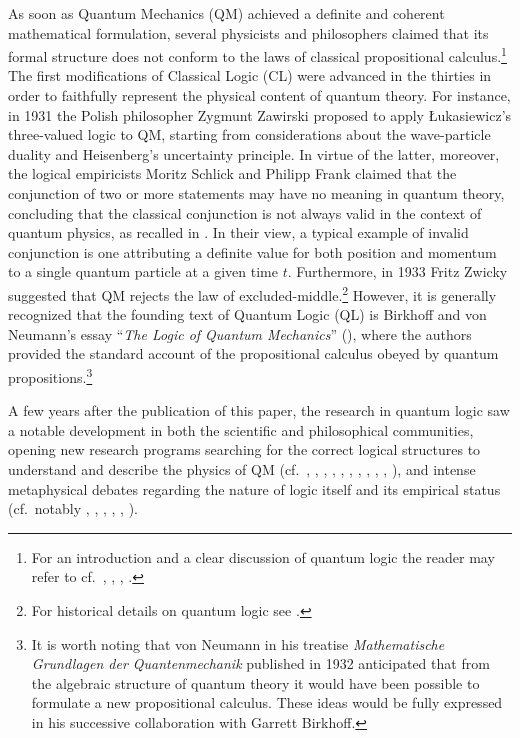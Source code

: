 \documentclass[11pt, executivepaper]{article}
\begin{document}
As soon as Quantum Mechanics (QM) achieved a definite and coherent mathematical formulation, several physicists and philosophers claimed that its formal structure does not conform to the laws of classical propositional calculus.\footnote{For an introduction and a clear discussion of quantum logic the reader may refer to cf.\ \cite{Giuntini:2002}, \cite{DallaChiara:2004}, \cite{deRonde:2016}, \cite{Wilce:2021}.} The first modifications of Classical Logic (CL) were advanced in the thirties in order to faithfully represent the physical content of quantum theory. For instance, in 1931 the Polish philosopher Zygmunt Zawirski proposed to apply \L ukasiewicz's three-valued logic to QM, starting from considerations about the wave-particle duality and Heisenberg's uncertainty principle. In virtue of the latter, moreover, the logical empiricists Moritz Schlick and Philipp Frank claimed that the conjunction of two or more statements may have no meaning in quantum theory, concluding that the classical conjunction is not always valid in the context of quantum physics, as recalled in \cite{Carnap:1966}. In their view, a typical example of invalid conjunction is one attributing a definite value for both position and momentum to a single quantum particle at a given time $t$. Furthermore, in 1933 Fritz Zwicky suggested that QM rejects the law of excluded-middle.\footnote{For historical details on quantum logic see \cite{Jammer:1974}.} However, it is generally recognized that the founding text of Quantum Logic (QL) is Birkhoff and von Neumann's essay ``\emph{The Logic of Quantum Mechanics}'' (\cite{vonNeumann:1936}), where the authors provided the standard account of the propositional calculus obeyed by quantum propositions.\footnote{It is worth noting that von Neumann in his treatise \emph{Mathematische Grundlagen der Quantenmechanik} published in 1932 anticipated that from the algebraic structure of quantum theory it would have been possible to formulate a new propositional calculus. These ideas would be fully expressed in his successive collaboration with Garrett Birkhoff.}

A few years after the publication of this paper, the research in quantum logic saw a notable development in both the scientific and philosophical communities, opening new research programs searching for the correct logical structures to understand and describe the physics of QM (cf.\ \cite{Reichenbach:1944}, \cite{Mackey:1957}, \cite{Finkelstein:1963}, \cite{Kochen:1965}, \cite{Jauch:1969}, \cite{Giuntini:2002}, \cite{DallaChiara:2004}, \cite{Pitowsky:2006}, \cite{Giuntini:2018}, \cite{Svozil:2020}, \cite{Holik:2021}), and intense metaphysical debates regarding the nature of logic itself and its empirical status (cf.\ notably \cite{Quine:1951}, \cite{Putnam:1968}, \cite{Dummett:1976}, \cite{Hallett:1982}, \cite{Weingartner:2004}, \cite{Bacciagaluppi:2009}). 
\end{document}
